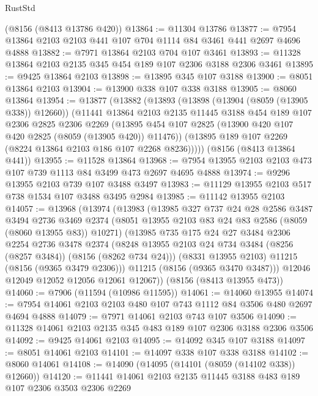 \begin{lexlean}{RustStd}
\begin{coremodule}
    (@8156 (@8413 @13786 @420))
@13864 := @11304 @13786
@13877 := @7954 @13864 @2103 @2103 @441 @107 @704 @1114 @84 @3461 @441 @2697 @4696 @4888
@13882 := @7971 @13864 @2103 @704 @107 @3461
@13893 := @11328 @13864 @2103 @2135 @345 @454 @189 @107 @2306 @3188 @2306 @3461
@13895 := @9425 @13864 @2103
@13898 := @13895 @345 @107 @3188
@13900 := @8051 @13864 @2103
@13904 := @13900 @338 @107 @338 @3188
@13905 := @8060 @13864
@13954 := @13877
    (@13882
      (@13893
        (@13898 (@13904 (@8059 (@13905 @338)) @12660))
        (@11441
          @13864
          @2103
          @2135
          @11445
          @3188
          @454
          @189
          @107
          @2306
          @2825
          @2306
          @2269
          (@13895 @454 @107 @2825 (@13900 @420 @107 @420 @2825 (@8059 (@13905 @420)) @11476))
          (@13895 @189 @107 @2269 (@8224 @13864 @2103 @186 @107 @2268 @8236)))))
    (@8156 (@8413 @13864 @441))
@13955 := @11528 @13864
@13968 := @7954 @13955 @2103 @2103 @473 @107 @739 @1113 @84 @3499 @473 @2697 @4695 @4888
@13974 := @9296 @13955 @2103 @739 @107 @3488 @3497
@13983 := @11129 @13955 @2103 @517 @738 @1534 @107 @3488 @3495 @2984
@13985 := @11142 @13955 @2103
@14057 := @13968
    (@13974
      (@13983
        (@13985
          @327
          @737
          @24
          @28
          @2586
          @3487
          @3494
          @2736
          @3469
          @2374
          (@8051 @13955 @2103 @83 @24 @83 @2586 (@8059 (@8060 @13955 @83)) @10271)
          (@13985
            @735
            @175
            @24
            @27
            @3484
            @2306
            @2254
            @2736
            @3478
            @2374
            (@8248 @13955 @2103 @24 @734 @3484 (@8256 (@8257 @3484)) (@8156 (@8262 @734 @24)))
            (@8331 @13955 @2103)
            @11215
            (@8156 (@9365 @3479 @2306)))
          @11215
          (@8156 (@9365 @3470 @3487)))
        @12046
        @12049
        @12052
        @12056
        @12061
        @12067))
    (@8156 (@8413 @13955 @473))
@14060 := @7906 (@11594 (@10986 @11595))
@14061 := @14060 @13955
@14074 := @7954 @14061 @2103 @2103 @480 @107 @743 @1112 @84 @3506 @480 @2697 @4694 @4888
@14079 := @7971 @14061 @2103 @743 @107 @3506
@14090 := @11328 @14061 @2103 @2135 @345 @483 @189 @107 @2306 @3188 @2306 @3506
@14092 := @9425 @14061 @2103
@14095 := @14092 @345 @107 @3188
@14097 := @8051 @14061 @2103
@14101 := @14097 @338 @107 @338 @3188
@14102 := @8060 @14061
@14108 := @14090 (@14095 (@14101 (@8059 (@14102 @338)) @12660))
@14120 := @11441 @14061 @2103 @2135 @11445 @3188 @483 @189 @107 @2306 @3503 @2306 @2269

\end{coremodule}
\end{lexlean}
